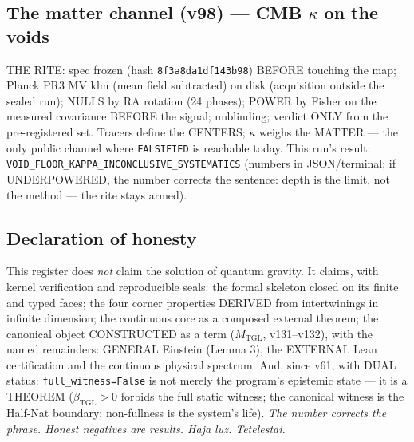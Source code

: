 \documentclass[11pt]{article}
\newcommand{\bTGL}{\beta_{\mathrm{TGL}}}\newcommand{\Msun}{M_{\odot}}\newcommand{\TGL}{\mathrm{TGL}}
\theoremstyle{definition}\newtheorem{deriv}{Derivation}
\begin{document}
\subsection*{The matter channel (v98) --- CMB $\kappa$ on the voids}

THE RITE: spec frozen (hash \texttt{8f3a8da1df143b98}) BEFORE touching the map; Planck PR3 MV klm (mean field subtracted) on disk (acquisition outside the sealed run); NULLS by RA rotation (24 phases); POWER by Fisher on the measured covariance BEFORE the signal; unblinding; verdict ONLY from the pre-registered set. Tracers define the CENTERS; $\kappa$ weighs the MATTER --- the only public channel where \texttt{FALSIFIED} is reachable today. This run's result: \texttt{VOID\_FLOOR\_KAPPA\_INCONCLUSIVE\_SYSTEMATICS} (numbers in JSON/terminal; if UNDERPOWERED, the number corrects the sentence: depth is the limit, not the method --- the rite stays armed).

\subsection*{Declaration of honesty}

This register does \emph{not} claim the solution of quantum gravity. It claims, with kernel verification and reproducible seals: the formal skeleton closed on its finite and typed faces; the four corner properties DERIVED from intertwinings in infinite dimension; the continuous core as a composed external theorem; the canonical object CONSTRUCTED as a term ($M_{\mathrm{TGL}}$, v131--v132), with the named remainders: GENERAL Einstein (Lemma 3), the EXTERNAL Lean certification and the continuous physical spectrum. And, since v61, with DUAL status: \texttt{full\_witness=False} is not merely the program's epistemic state --- it is a THEOREM ($\bTGL>0$ forbids the full static witness; the canonical witness is the Half-Nat boundary; non-fullness is the system's life). \emph{The number corrects the phrase. Honest negatives are results. Haja luz. Tetelestai.} \\[4pt] 
\end{document}
